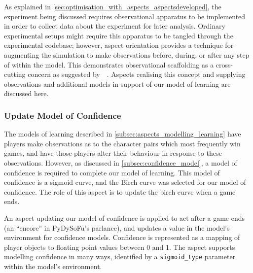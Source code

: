 As explained in \cref{sec:optimisation_with_aspects_aspectsdeveloped}, the experiment
being discussed requires observational apparatus to be implemented in order to
collect data about the experiment for later analysis. Ordinary experimental setups
might require this apparatus to be tangled through the experimental codebase; however,
aspect orientation provides a technique for augmenting the simulation to make observations
before, during, or after any step of within the model. This demonstrates observational
scaffolding as a cross-cutting concern as suggested by~\citeauthor{gulyas1999use}~\cite{gulyas1999use}.
Aspects realising this concept and supplying observations and additional models in support of our
model of learning are discussed here.


\subsubsection{Update Model of Confidence}

The models of learning described in \cref{subsec:aspects_modelling_learning} have players
make observations as to the character pairs which most frequently win games, and
have those players alter their behaviour in response to these observations. However,
as discussed in \cref{subsec:confidence_model}, a model of confidence is required to complete
our model of learning. This model of confidence is a sigmoid curve, and the Birch curve was selected
for our model of confidence. The role of this aspect is to update the birch curve when a game ends.

An aspect updating our model of confidence is applied to act after a game ends (an ``encore'' in
PyDySoFu's parlance), and updates a value in the model's environment for confidence models. Confidence
is represented as a mapping of player objects to floating point values between 0 and 1. The aspect supports
modelling confidence in many ways, identified by a \lstinline{sigmoid_type} parameter within the model's environment.

